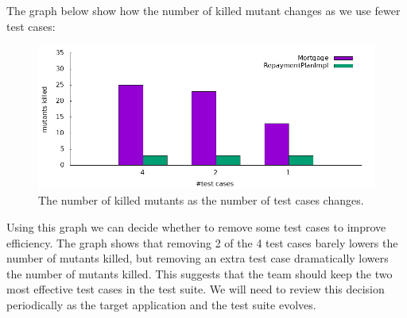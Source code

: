 \documentclass[a4paper, openany]{memoir}
\begin{document}
The graph below show how the number of killed mutant changes as we use fewer test cases:
\begin{figure}[H]
    \centering
    \includegraphics[scale=0.5]{src/12 Efficiency v no of test cases.png}
    \caption{The number of killed mutants as the number of test cases changes.}
\end{figure}
\noindent Using this graph we can decide whether to remove some test cases to improve efficiency. The graph shows that removing 2 of the 4 test cases barely lowers the number of mutants killed, but removing an extra test case dramatically lowers the number of mutants killed. This suggests that the team should keep the two most effective test cases in the test suite. We will need to review this decision periodically as the target application and the test suite evolves.
\end{document}
